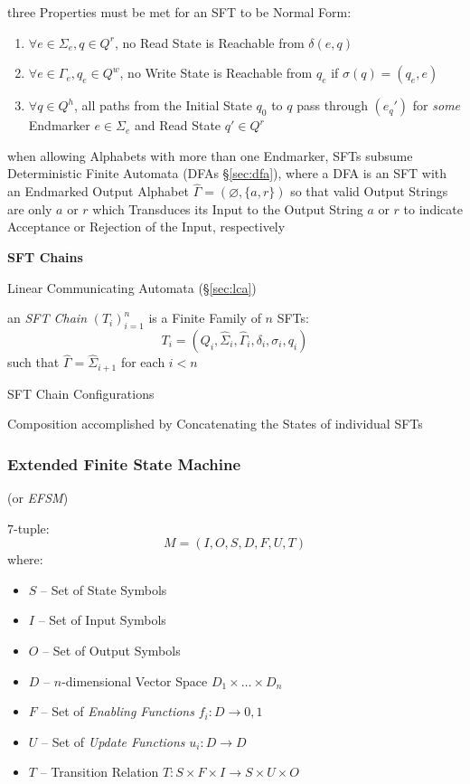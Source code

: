 three Properties must be met for an SFT to be Normal Form:
\begin{enumerate}
  \item $\forall e \in \Sigma_e, q \in Q^r$, no Read State is
    Reachable from $\delta(e,q)$
  \item $\forall e \in \Gamma_e, q_e \in Q^w$, no Write State is
    Reachable from $q_e$ if $\sigma(q) = (q_e,e)$
  \item $\forall q \in Q^h$, all paths from the Initial State $q_0$ to
    $q$ pass through $(e_q')$ for \emph{some} Endmarker $e \in
    \Sigma_e$ and Read State $q' \in Q^r$
\end{enumerate}

when allowing Alphabets with more than one Endmarker, SFTs subsume
Deterministic Finite Automata (DFAs \S\ref{sec:dfa}), where a DFA is
an SFT with an Endmarked Output Alphabet $\hat{\Gamma} = (\varnothing,
\{a,r\})$ so that valid Output Strings are only $a$ or $r$ which
Transduces its Input to the Output String $a$ or $r$ to indicate
Acceptance or Rejection of the Input, respectively


\textbf{SFT Chains}

Linear Communicating Automata (\S\ref{sec:lca})

an \emph{SFT Chain} $(T_i)^n_{i=1}$ is a Finite Family of $n$ SFTs:
\[
  T_i = (Q_i,\hat{\Sigma}_i,\hat{\Gamma}_i,\delta_i,\sigma_i,q_i)
\]
such that $\hat{\Gamma} = \hat{\Sigma}_{i+1}$ for each $i < n$

SFT Chain Configurations

Composition accomplished by Concatenating the States of individual SFTs



\subsubsection{Extended Finite State Machine}\label{sec:extended_state}

(or \emph{EFSM})

$7$-tuple:
\[
  M = (I,O,S,D,F,U,T)
\]
where:
\begin{itemize}
  \item $S$ -- Set of State Symbols
  \item $I$ -- Set of Input Symbols
  \item $O$ -- Set of Output Symbols
  \item $D$ -- $n$-dimensional Vector Space $D_1 \times \ldots \times
    D_n$
  \item $F$ -- Set of \emph{Enabling Functions} $f_i : D \rightarrow
    {0,1}$
  \item $U$ -- Set of \emph{Update Functions} $u_i : D \rightarrow D$
  \item $T$ -- Transition Relation $T : S \times F \times I
    \rightarrow S \times U \times O$
\end{itemize}



